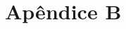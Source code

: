 \documentclass[
	12pt, %
    oneside, %
	a4paper, %
	chapter=TITLE, %
	english, %
	brazil %
	]{abntex2}
\begin{document}
\chapter{Apêndice B}

\addto\captionsportuguese{\renewcommand{\bibname}{Reference}}
\renewcommand{\bibname}{Referências}

%
\end{document}
